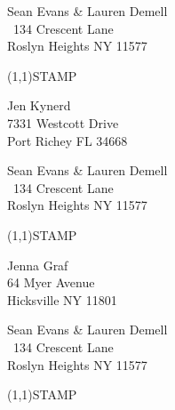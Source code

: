 \documentclass[12pt]{article}
\begin{document}
\begin{minipage}{.5\linewidth} \noindent
Sean Evans \& Lauren Demell\\\ 
134 Crescent Lane\\ 
Roslyn Heights NY 11577
\end{minipage}
\begin{minipage}{.5\linewidth \hspace{-.2in} \vspace{-.3in}}
\begin{flushright}
\framebox(1,1){STAMP}
\end{flushright}
\end{minipage}

\begin{center} \begin{Huge} \vspace*{\fill}
Jen Kynerd\\
7331 Westcott Drive\\
Port Richey FL 34668\\
\vspace{\fill} \end{Huge} \end{center}

\clearpage

\begin{minipage}{.5\linewidth} \noindent
Sean Evans \& Lauren Demell\\\ 
134 Crescent Lane\\ 
Roslyn Heights NY 11577
\end{minipage}
\begin{minipage}{.5\linewidth \hspace{-.2in} \vspace{-.3in}}
\begin{flushright}
\framebox(1,1){STAMP}
\end{flushright}
\end{minipage}

\begin{center} \begin{Huge} \vspace*{\fill}
Jenna Graf\\
64 Myer Avenue\\
Hicksville NY 11801\\
\vspace{\fill} \end{Huge} \end{center}

\clearpage

\begin{minipage}{.5\linewidth} \noindent
Sean Evans \& Lauren Demell\\\ 
134 Crescent Lane\\ 
Roslyn Heights NY 11577
\end{minipage}
\begin{minipage}{.5\linewidth \hspace{-.2in} \vspace{-.3in}}
\begin{flushright}
\framebox(1,1){STAMP}
\end{flushright}
\end{minipage}
\end{document}
